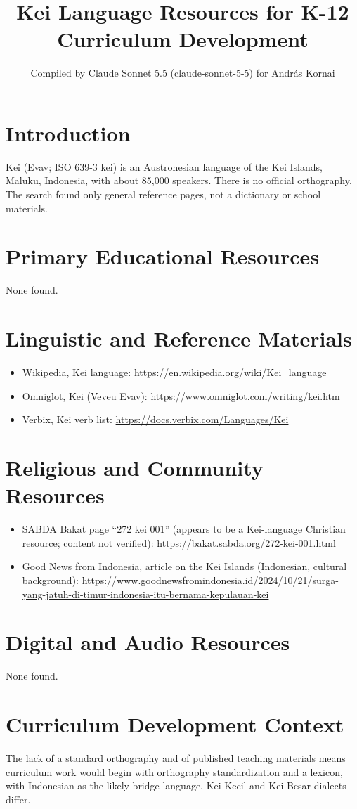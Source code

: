 \documentclass[12pt]{article}
\title{Kei Language Resources for K-12 Curriculum Development}
\author{Compiled by Claude Sonnet 5.5 (claude-sonnet-5-5) for Andr\'as Kornai}
\date{}
\begin{document}
\maketitle
\section{Introduction}
Kei (Evav; ISO 639-3 kei) is an Austronesian language of the Kei Islands, Maluku, Indonesia, with about 85,000 speakers. There is no official orthography. The search found only general reference pages, not a dictionary or school materials.
\section{Primary Educational Resources}
None found.
\section{Linguistic and Reference Materials}
\begin{itemize}
\item Wikipedia, Kei language: \url{https://en.wikipedia.org/wiki/Kei_language}
\item Omniglot, Kei (Veveu Evav): \url{https://www.omniglot.com/writing/kei.htm}
\item Verbix, Kei verb list: \url{https://docs.verbix.com/Languages/Kei}
\end{itemize}
\section{Religious and Community Resources}
\begin{itemize}
\item SABDA Bakat page ``272 kei 001'' (appears to be a Kei-language Christian resource; content not verified): \url{https://bakat.sabda.org/272-kei-001.html}
\item Good News from Indonesia, article on the Kei Islands (Indonesian, cultural background): \url{https://www.goodnewsfromindonesia.id/2024/10/21/surga-yang-jatuh-di-timur-indonesia-itu-bernama-kepulauan-kei}
\end{itemize}
\section{Digital and Audio Resources}
None found.
\section{Curriculum Development Context}
The lack of a standard orthography and of published teaching materials means curriculum work would begin with orthography standardization and a lexicon, with Indonesian as the likely bridge language. Kei Kecil and Kei Besar dialects differ.
\end{document}
